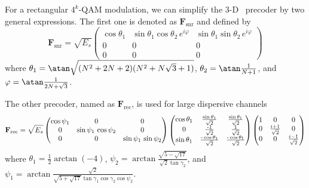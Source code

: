 For a rectangular $4^k$-QAM modulation, we can simplify the 3-D \maxdmin\ precoder by two general expressions. The first one is denoted as $\mathbf{F}_{\text{snr}}$ and defined by
\begin{equation*}
\mathbf{F}_{\text{snr}}= \sqrt{E_s} 
\begin{pmatrix}
\cos \theta_1 &  \sin\theta_1 \cos\theta_2  \, e^{i\varphi} & \sin\theta_1 \sin\theta_2  \, e^{i\varphi} \\
0 &0 & 0 \\
0 &0 & 0
\end{pmatrix}
\end{equation*}
where $\theta_1=\atan\sqrt{(N^2 + 2N +2) (N^2+N\sqrt{3}+1)}$, $\theta_2 =\atan \frac{1}{N+1}$, and $\varphi =\atan \frac{1}{2N + \sqrt{3}}$. 

The other precoder, named as $\mathbf{F}_{\text{rec}}$, is used for large dispersive channels 
\begin{equation*}
\mathbf{F}_{\text{rec}}= \sqrt{E_s} 
\begin{pmatrix}
\cos \psi_1 &  0 & 0 \\
0 & \sin\psi_1 \, \cos \psi_2 & 0 \\
0 & 0 &  \sin\psi_1 \, \sin \psi_2 \\
\end{pmatrix}
\begin{pmatrix}
\cos \theta_1 &  \sin \theta_1 \over \sqrt{2}           	& \sin \theta_1 \over \sqrt{2} \\
0     & \text{-}  1 \over \sqrt{2}   	&  1 \over \sqrt{2}  \\
\sin \theta_1 & \text{-}\cos \theta_1 \over \sqrt{2}	& \text{-}\cos \theta_1 \over \sqrt{2}  \\
\end{pmatrix} 
\begin{pmatrix}
1 &  0 & 0 \\
0 & {i+1} \over \sqrt{2} & 0 \\
0 & 0 &  {i-1} \over \sqrt{2} \\
\end{pmatrix}
\end{equation*}
where $\theta_1=\frac{1}{2} \arctan(-4)$, $\psi_2=\arctan \frac{\sqrt{5-\sqrt{17}}}{\sqrt{2} \tan\gamma_2}$, and $\psi_1=\arctan \frac{\sqrt{2}}{\sqrt{5+\sqrt{17}} \tan\gamma_1 \cos\gamma_2  \cos\psi_2}$. 

